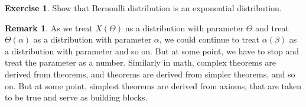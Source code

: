 \documentclass[14pt, reqno]{amsart}
\theoremstyle{definition}
\newtheorem{exercise}[theorem]{Exercise}
\newtheorem{remark}[theorem]{Remark}
\begin{document}
\begin{exercise} Show that Bernoulli distribution is an exponential distribution.
\end{exercise}

\begin{remark} As we treat $X(\Theta)$ as a distribution with parameter $\Theta$ and treat $\Theta(\alpha)$ as a distribution with parameter $\alpha$, we could continue to treat $\alpha(\beta)$ as a distribution with parameter and so on. But at some point, we have to stop and treat the parameter as a number. Similarly in math, complex theorems are derived from theorems, and theorems are derived from simpler theorems, and so on. But at some point, simplest theorems are derived from axioms, that are taken to be true and serve as building blocks. 
\end{remark}

\newpage
\begin{bibdiv}
\begin{biblist}
\end{biblist}
\end{bibdiv}
\end{document}
